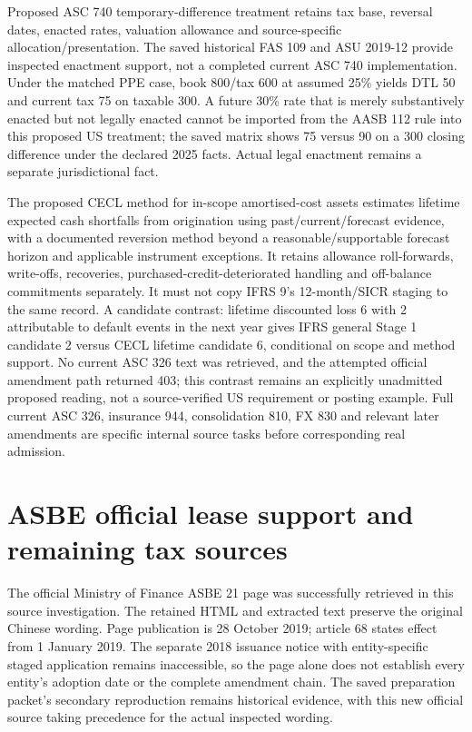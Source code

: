 Proposed ASC 740 temporary-difference treatment retains tax base, reversal dates, enacted rates, valuation allowance and source-specific allocation/presentation. The saved historical FAS 109 and ASU 2019-12 provide inspected enactment support, not a completed current ASC 740 implementation. Under the matched PPE case, book 800/tax 600 at assumed 25\% yields DTL 50 and current tax 75 on taxable 300. A future 30\% rate that is merely substantively enacted but not legally enacted cannot be imported from the AASB 112 rule into this proposed US treatment; the saved matrix shows 75 versus 90 on a 300 closing difference under the declared 2025 facts. Actual legal enactment remains a separate jurisdictional fact.

The proposed CECL method for in-scope amortised-cost assets estimates lifetime expected cash shortfalls from origination using past/current/forecast evidence, with a documented reversion method beyond a reasonable/supportable forecast horizon and applicable instrument exceptions. It retains allowance roll-forwards, write-offs, recoveries, purchased-credit-deteriorated handling and off-balance commitments separately. It must not copy IFRS 9's 12-month/SICR staging to the same record. A candidate contrast: lifetime discounted loss 6 with 2 attributable to default events in the next year gives IFRS general Stage 1 candidate 2 versus CECL lifetime candidate 6, conditional on scope and method support. No current ASC 326 text was retrieved, and the attempted official amendment path returned 403; this contrast remains an explicitly unadmitted proposed reading, not a source-verified US requirement or posting example. Full current ASC 326, insurance 944, consolidation 810, FX 830 and relevant later amendments are specific internal source tasks before corresponding real admission.

\hypertarget{asbe-official-lease-support-and-remaining-tax-sources}{%
\section{ASBE official lease support and remaining tax sources}\label{method-standards-methods-asbe-official-lease-support-and-remaining-tax-sources}}

The official Ministry of Finance ASBE 21 page was successfully retrieved in this source investigation. The retained HTML and extracted text preserve the original Chinese wording. Page publication is 28 October 2019; article 68 states effect from 1 January 2019. The separate 2018 issuance notice with entity-specific staged application remains inaccessible, so the page alone does not establish every entity's adoption date or the complete amendment chain. The saved preparation packet's secondary reproduction remains historical evidence, with this new official source taking precedence for the actual inspected wording.

